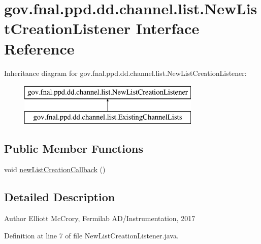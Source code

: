 \hypertarget{interfacegov_1_1fnal_1_1ppd_1_1dd_1_1channel_1_1list_1_1NewListCreationListener}{\section{gov.\-fnal.\-ppd.\-dd.\-channel.\-list.\-New\-List\-Creation\-Listener Interface Reference}
\label{interfacegov_1_1fnal_1_1ppd_1_1dd_1_1channel_1_1list_1_1NewListCreationListener}
}
Inheritance diagram for gov.\-fnal.\-ppd.\-dd.\-channel.\-list.\-New\-List\-Creation\-Listener\-:\begin{figure}[H]
\begin{center}
\leavevmode
\includegraphics[height=2.000000cm]{interfacegov_1_1fnal_1_1ppd_1_1dd_1_1channel_1_1list_1_1NewListCreationListener}
\end{center}
\end{figure}
\subsection*{Public Member Functions}
\begin{DoxyCompactItemize}
\item 
void \hyperlink{interfacegov_1_1fnal_1_1ppd_1_1dd_1_1channel_1_1list_1_1NewListCreationListener_a453407f350d9eacded942c7336dd97c5}{new\-List\-Creation\-Callback} ()
\end{DoxyCompactItemize}


\subsection{Detailed Description}
\begin{DoxyAuthor}{Author}
Elliott Mc\-Crory, Fermilab A\-D/\-Instrumentation, 2017 
\end{DoxyAuthor}


Definition at line 7 of file New\-List\-Creation\-Listener.\-java.



